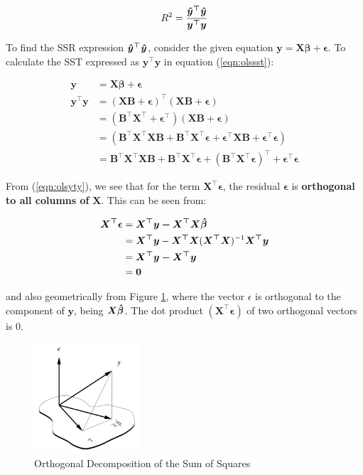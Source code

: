 \documentclass{article}
\begin{document}
\begin{equation}\label{eqn:olsr2}
    R^2 = \frac{\bm{\Hat{y}^\top}\bm{\Hat{y}}}{\bm{\bm{y^\top y}}} 
\end{equation}

\noindent To find the SSR expression $\bm{\Hat{y}^\top \Hat{y}}$, consider the given equation $\bm{y} = \bm{X\beta + \epsilon}$. To calculate the SST expressed as $\bm{y^\top y}$ in equation (\ref{eqn:olssst}):

\begin{align}
    \nonumber \bm{y} &= \bm{X\beta + \epsilon} \\ \nonumber
    \bm{y^\top y} &= \bm{(XB + \epsilon)^\top (XB + \epsilon)} \\ \nonumber
    &= \bm{(B^\top X^\top  + \epsilon^\top)(XB + \epsilon)} \\ \nonumber
    &= \bm{(B^\top X^\top X B + B^\top X^\top \epsilon + \epsilon^\top XB + \epsilon^\top \epsilon)} \\
    \label{eqn:olsyty} &= \bm{B^\top X^\top XB + B^\top X^\top \epsilon + (B^\top X^\top \epsilon)^\top + \epsilon^\top \epsilon}
\end{align}

\noindent From (\ref{eqn:olsyty}), we see that for the term $\bm{X^\top \epsilon}$, the residual $\bm{\epsilon}$ is \textbf{orthogonal to all columns of} $\bm{X}$. This can be seen from:

\begin{align}
    \nonumber \bm{X^\top \epsilon} &= \bm{X^\top y - X^\top X\Hat{\bm{\beta}}} \\ \nonumber
    &= \bm{X^\top y} - \bm{X^\top X}(\bm{X^\top X})^{-1} \bm{X^\top} \bm{y} \\ \nonumber
    &= \bm{X^\top y - X^\top y} \\ 
    \label{eqn:olsorthogonalproof} &= \bm{0}
\end{align}

\noindent and also geometrically from Figure \ref{fig:olsdecomss}, where the vector $\epsilon$ is orthogonal to the component of $\bm{y}$, being $\bm{X\Hat{\beta}}$. The dot product $(\bm{X^\top \epsilon})$ of two orthogonal vectors is 0.

\begin{figure}[H]
    \centering
    \includegraphics[width=0.35\textwidth]{Images/orthogonalvectorsols.png}
    \caption{Orthogonal Decomposition of the Sum of Squares}
    \label{fig:olsdecomss}
\end{figure}
\end{document}
